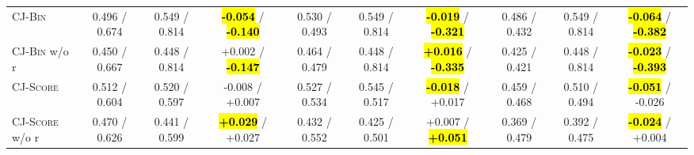 \begin{table}[!t]
\begin{tabular}{@{}l|ccc|ccc|ccc@{}}
        \midrule
        \textsc{CJ-Bin}              & 0.496 / 0.674    & 0.549 / 0.814    & \hl{\textbf{-0.054}} / \hl{\textbf{-0.140}}  & 0.530 / 0.493    & 0.549 / 0.814    & \hl{\textbf{-0.019}} / \hl{\textbf{-0.321}}  & 0.486 / 0.432    & 0.549 / 0.814    & \hl{\textbf{-0.064}} / \hl{\textbf{-0.382}}  \\
        \textsc{CJ-Bin} w/o r        & 0.450 / 0.667    & 0.448 / 0.814    & +0.002 / \hl{\textbf{-0.147}}                & 0.464 / 0.479    & 0.448 / 0.814    & \hl{\textbf{+0.016}} / \hl{\textbf{-0.335}}  & 0.425 / 0.421    & 0.448 / 0.814    & \hl{\textbf{-0.023}} / \hl{\textbf{-0.393}}  \\
        \midrule
        \textsc{CJ-Score}            & 0.512 / 0.604    & 0.520 / 0.597    & -0.008 / +0.007                              & 0.527 / 0.534    & 0.545 / 0.517    & \hl{\textbf{-0.018}} / +0.017                & 0.459 / 0.468    & 0.510 / 0.494    & \hl{\textbf{-0.051}} / -0.026                \\
        \textsc{CJ-Score} w/o r      & 0.470 / 0.626    & 0.441 / 0.599    & \hl{\textbf{+0.029}} / +0.027                & 0.432 / 0.552    & 0.425 / 0.501    & +0.007 / \hl{\textbf{+0.051}}                & 0.369 / 0.479    & 0.392 / 0.475    & \hl{\textbf{-0.024}} / +0.004                \\
        \bottomrule
    \end{tabular}
\end{table}